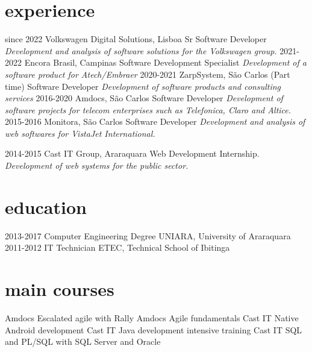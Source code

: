 \documentclass[]{friggeri-cv}
\begin{document}
\section{experience}
\begin{entrylist}
  \entry
    {since 2022}
    {Volkswagen Digital Solutions, Lisboa}
    {Sr Software Developer}
    {\emph{Development and analysis of software solutions for the Volkswagen group.}}
  \entry
    {2021-2022}
    {Encora Brasil, Campinas}
    {Software Development Specialist}
    {\emph{Development of a software product for Atech/Embraer}}
  \entry
    {2020-2021}
    {ZarpSystem, São Carlos (Part time)}
    {Software Developer}
    {\emph{Development of software products and consulting services}}
  \entry
    {2016-2020}
    {Amdocs, São Carlos}
    {Software Developer}
    {\emph{Development of software projects for telecom enterprises such as Telefonica, Claro and Altice.}}
  \entry
    {2015-2016}
    {Monitora, São Carlos}
    {Software Developer}
    {\emph{Development and analysis of web softwares for VistaJet International.}}
\begin{comment}
  \entry
    {09-11 2015}
    {Simples, Araraquara}
    {Mobile Development Internship.}
    {\emph{Development of Android apps.}}
\end{comment}
  \entry
    {2014-2015}
    {Cast IT Group, Araraquara}
    {Web Development Internship.}
    {\emph{Development of web systems for the public sector.}}


\end{entrylist}
    
\section{education}

\begin{entrylist}
  \entry
    {2013-2017}
    {Computer Engineering Degree}
    {UNIARA, University of Araraquara}
    { }
  \entry
    {2011-2012}
    {IT Technician {\normalfont}}
    {ETEC, Technical School of Ibitinga}
    {\emph{}}
\end{entrylist}

\section{main courses}

\begin{entrylist}
  \entry
    {Amdocs}
    {Escalated agile with Rally}
    {}
    {\emph{}}
  \entry
    {Amdocs}
    {Agile fundamentals}
    {}
    {\emph{}}
  \entry
    {Cast IT}
    {Native Android development}
    {}
    {\emph{}}
  \entry
    {Cast IT}
    {Java development intensive training}
    {}
    {\emph{}}
   \entry
    {Cast IT}
    {SQL and PL/SQL with SQL Server and Oracle}
    {}
    {\emph{}}
    
\end{entrylist}
\\
\\
\end{document}
